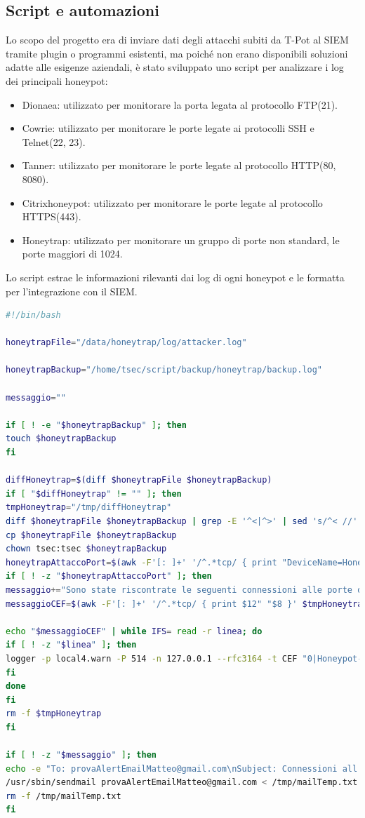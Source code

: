\subsection{Script e automazioni}
Lo scopo del progetto era di inviare dati degli attacchi subiti da T-Pot al SIEM tramite plugin o programmi esistenti, ma poiché non erano disponibili soluzioni adatte alle esigenze aziendali, è stato sviluppato uno script per analizzare i log dei principali honeypot: 
\begin{itemize}
	\item Dionaea: utilizzato per monitorare la porta legata al protocollo FTP(21).
	\item Cowrie: utilizzato per monitorare le porte legate ai protocolli SSH e Telnet(22, 23).
	\item Tanner: utilizzato per monitorare le porte legate al protocollo HTTP(80, 8080).
	\item Citrixhoneypot: utilizzato per monitorare le porte legate al protocollo HTTPS(443).
	\item Honeytrap: utilizzato per monitorare un gruppo di porte non standard, le porte maggiori di 1024.
\end{itemize}
Lo script estrae le informazioni rilevanti dai log di ogni honeypot e le formatta per l'integrazione con il SIEM.\\
\begin{lstlisting}[language=bash,caption={CEF\_Script.sh}]
#!/bin/bash

honeytrapFile="/data/honeytrap/log/attacker.log"

honeytrapBackup="/home/tsec/script/backup/honeytrap/backup.log"

messaggio=""

if [ ! -e "$honeytrapBackup" ]; then
touch $honeytrapBackup
fi

diffHoneytrap=$(diff $honeytrapFile $honeytrapBackup)
if [ "$diffHoneytrap" != "" ]; then
tmpHoneytrap="/tmp/diffHoneytrap"
diff $honeytrapFile $honeytrapBackup | grep -E '^<|^>' | sed 's/^< //' > $tmpHoneytrap
cp $honeytrapFile $honeytrapBackup
chown tsec:tsec $honeytrapBackup
honeytrapAttaccoPort=$(awk -F'[: ]+' '/^.*tcp/ { print "DeviceName=Honeypot DestinationIP="$11" DestinationPort="$12" ApplicationProtocol= SourceIP="$8" SourcePort="$9"" }' $tmpHoneytrap | sort -u)
if [ ! -z "$honeytrapAttaccoPort" ]; then
messaggio+="Sono state riscontrate le seguenti connessioni alle porte dell'honeypot:\n$honeytrapAttaccoPort\n"
messaggioCEF=$(awk -F'[: ]+' '/^.*tcp/ { print $12" "$8 }' $tmpHoneytrap | sort | uniq -c | awk '{print "reason=Honeytrap cn1="$1" src="$3" dpt="$2}')

echo "$messaggioCEF" | while IFS= read -r linea; do
if [ ! -z "$linea" ]; then
logger -p local4.warn -P 514 -n 127.0.0.1 --rfc3164 -t CEF "0|Honeypot-Test|Honeypot-Test|0.1|event-honeypot-test|end|TRAFFIC|$linea"
fi
done
fi
rm -f $tmpHoneytrap
fi

if [ ! -z "$messaggio" ]; then
echo -e "To: provaAlertEmailMatteo@gmail.com\nSubject: Connessioni all'honeypot\n$messaggio" >> /tmp/mailTemp.txt
/usr/sbin/sendmail provaAlertEmailMatteo@gmail.com < /tmp/mailTemp.txt
rm -f /tmp/mailTemp.txt
fi
\end{lstlisting}
